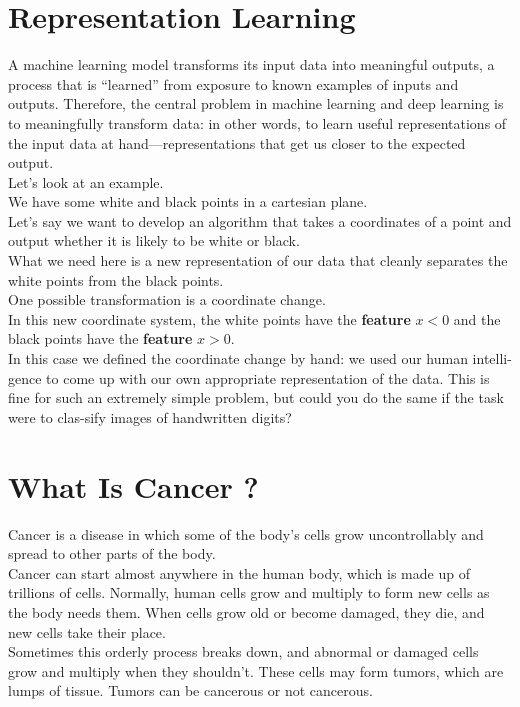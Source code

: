 \documentclass{SBCbookchapter}
\begin{document}
\section*{Representation Learning}
A machine learning model transforms its input data
into meaningful outputs, a process that is “learned” 
from exposure to known examples of inputs and outputs. 
Therefore,  the  central  problem  in  machine  learning
and  deep  learning  is  to meaningfully transform  data:
in  other  words,  to  learn  useful representations
of  the  input  data  at hand—representations that 
get us closer to the expected output. \\
Let's look at an example. \\
We have some white and black points in a cartesian plane. \\
Let's say we want to develop an algorithm that takes a coordinates
of a point and output whether it is likely to be white or black. \\
What we need here is a new representation of our data that cleanly 
separates the white points  from  the  black  points. \\
One  possible transformation is a coordinate change. \\
In this new coordinate system, the white points have the \textbf{feature}
$x < 0$ and the black points have the \textbf{feature} $x > 0$. \\
In this case we defined the coordinate change by hand: 
we used our human intelli-gence to come up with our 
own appropriate representation of the data. This 
is fine for such an extremely simple problem, 
but could you do the same if the task were to 
clas-sify images of handwritten digits?

\section*{What Is Cancer ?}
Cancer is a disease in which some of the body’s 
cells grow uncontrollably and spread to other parts of the body. \\ 
Cancer can start almost anywhere in the human body, 
which is made up of trillions of cells. Normally, 
human cells grow and multiply to form new cells as the 
body needs them. When cells grow old or become 
damaged, they die, and new cells take their place. \\
Sometimes this orderly process breaks down, and
abnormal or damaged cells grow and multiply when
they shouldn’t. These cells may form tumors, which
are lumps of tissue. Tumors can be cancerous or
not cancerous. 
\end{document}
